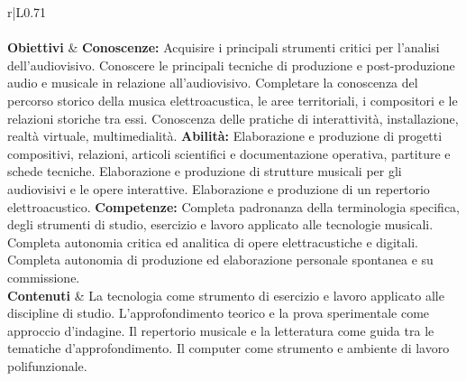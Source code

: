 \begin{longtable}{r|L{0.71\textwidth}}
   \\
   \\
  \endhead
  \hline
  \textbf{Obiettivi} &
    \textbf{Conoscenze:} \newline
      Acquisire i principali strumenti critici per l'analisi dell'audiovisivo.  \newline
      Conoscere le principali tecniche di produzione e post-produzione audio e musicale in relazione all'audiovisivo.  \newline
      Completare la conoscenza del percorso storico della musica elettroacustica, le aree territoriali, i compositori e le relazioni storiche tra essi.  \newline
      Conoscenza delle pratiche di interattività, installazione, realtà virtuale, multimedialità.  \newline
    \textbf{Abilità:} \newline
      Elaborazione e produzione di progetti compositivi, relazioni, articoli scientifici e documentazione operativa, partiture e schede tecniche. \newline
      Elaborazione e produzione di strutture musicali per gli audiovisivi e le opere interattive.\newline
      Elaborazione e produzione di un repertorio elettroacustico. \newline
    \textbf{Competenze:} \newline
      Completa padronanza della terminologia specifica, degli strumenti di studio, esercizio e lavoro applicato alle tecnologie musicali. \newline
      Completa autonomia critica ed analitica di opere elettracustiche e digitali. \newline
      Completa autonomia di produzione ed elaborazione personale spontanea e su commissione. \\
    \hline
    \textbf{Contenuti} &
      La tecnologia come strumento di esercizio e lavoro applicato alle
      discipline di studio. L'approfondimento teorico e la prova sperimentale
      come approccio d'indagine. Il repertorio musicale e la letteratura come
      guida tra le tematiche d'approfondimento. \newline
      Il computer come strumento e ambiente di lavoro polifunzionale. \newline

\end{longtable}
